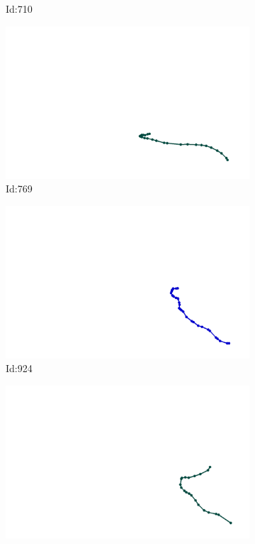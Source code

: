 \documentclass[12pt,twoside]{report}
\begin{document}
\begin{figure}
\begin{subfigure}[b]{0.20\textwidth}
\caption{Id:710}
\end{subfigure}
\begin{subfigure}[b]{0.20\textwidth}
\centering
\includegraphics[width=\textwidth]{../trajectories/769.png}
\caption{Id:769}
\end{subfigure}
\begin{subfigure}[b]{0.20\textwidth}
\centering
\includegraphics[width=\textwidth]{../trajectories/924.png}
\caption{Id:924}
\end{subfigure}
\begin{subfigure}[b]{0.20\textwidth}
\centering
\includegraphics[width=\textwidth]{../trajectories/944.png}

\end{subfigure}
\end{figure}
\end{document}
